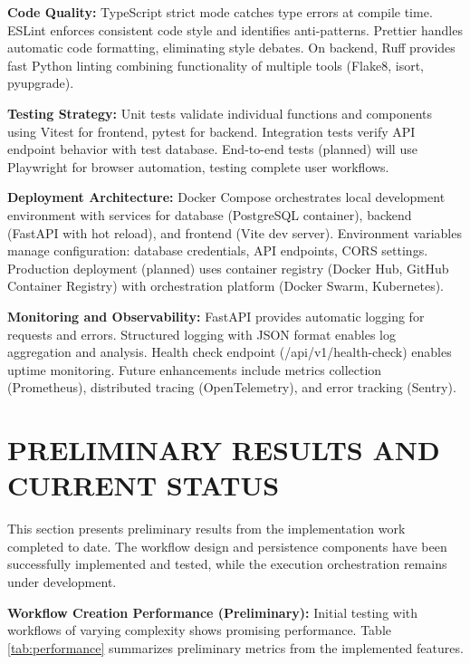 \documentclass[12pt]{article}
\begin{document}
\hspace{\parindent}\textbf{Code Quality:} TypeScript strict mode catches type errors at compile time. ESLint enforces consistent code style and identifies anti-patterns. Prettier handles automatic code formatting, eliminating style debates. On backend, Ruff provides fast Python linting combining functionality of multiple tools (Flake8, isort, pyupgrade).

\hspace{\parindent}\textbf{Testing Strategy:} Unit tests validate individual functions and components using Vitest for frontend, pytest for backend. Integration tests verify API endpoint behavior with test database. End-to-end tests (planned) will use Playwright for browser automation, testing complete user workflows.

\hspace{\parindent}\textbf{Deployment Architecture:} Docker Compose orchestrates local development environment with services for database (PostgreSQL container), backend (FastAPI with hot reload), and frontend (Vite dev server). Environment variables manage configuration: database credentials, API endpoints, CORS settings. Production deployment (planned) uses container registry (Docker Hub, GitHub Container Registry) with orchestration platform (Docker Swarm, Kubernetes).

\hspace{\parindent}\textbf{Monitoring and Observability:} FastAPI provides automatic logging for requests and errors. Structured logging with JSON format enables log aggregation and analysis. Health check endpoint (/api/v1/health-check) enables uptime monitoring. Future enhancements include metrics collection (Prometheus), distributed tracing (OpenTelemetry), and error tracking (Sentry).

\newpage
\section{PRELIMINARY RESULTS AND CURRENT STATUS}

\hspace{\parindent}This section presents preliminary results from the implementation work completed to date. The workflow design and persistence components have been successfully implemented and tested, while the execution orchestration remains under development.

\hspace{\parindent}\textbf{Workflow Creation Performance (Preliminary):} Initial testing with workflows of varying complexity shows promising performance. Table \ref{tab:performance} summarizes preliminary metrics from the implemented features.
\end{document}
